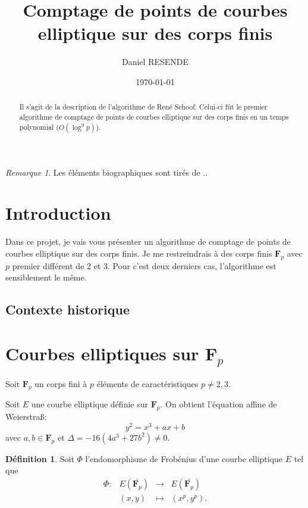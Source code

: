 \documentclass[fleqn,leqno]{article}%
\title{Comptage de points de courbes elliptique sur des corps finis}
\author{Daniel RESENDE}
\date{\today}
\theoremstyle{plain}
\theoremstyle{definition}
\newtheorem{definition}{Définition}[section]
\theoremstyle{remark}
\newtheorem*{remarque}{Remarque}
\numberwithin{equation}{section}
\begin{document}
\maketitle

\begin{abstract}
Il s'agit de la description de l'algorithme de René Schoof. Celui-ci fût le premier algorithme de comptage de points de courbes elliptique sur des corps finis en un temps polynomial ($O(\log^{9} p)$).  
\end{abstract}

\begin{remarque}
Les éléments biographiques sont tirés de ..
\end{remarque}

\tableofcontents

\clearpage{}
\section*{Introduction}

Dans ce projet, je vais vous présenter un algorithme de comptage de points de courbes elliptique sur des corps finis. Je me restreindrais à des corps finis $\mathbf{F}_{p}$ avec $p$ premier différent de 2 et 3. Pour c'est deux derniers cas, l'algorithme est sensiblement le même. 

\subsection{Contexte historique}




\section{Courbes elliptiques sur $\mathbf{F}_{p}$}

Soit $\mathbf{F}_{p}$ un corps fini à $p$ éléments de caractéristiques $p\neq 2,3$.

Soit $E$ une courbe elliptique définie sur $\mathbf{F}_{p}$. On obtient l'équation affine de Weierstra\ss : $$y^{2} = x^{3} + ax + b$$ avec $a,b\in\mathbf{F}_{p}$ et $\Delta = -16(4a^{3} + 27b^{2}) \neq 0$.

\begin{definition}
Soit $\varPhi$ l'endomorphisme de Frobénius d'une courbe elliptique $E$ tel que  
$$\begin{array}{clcl}
\varPhi : &E(\bar{\mathbf{F}_{p}}) &\longrightarrow &E(\bar{\mathbf{F}_{p}})\\
&(x, y) &\longmapsto	&(x^{p}, y^{p}).\\
\end{array}$$
\end{definition}
\end{document}
